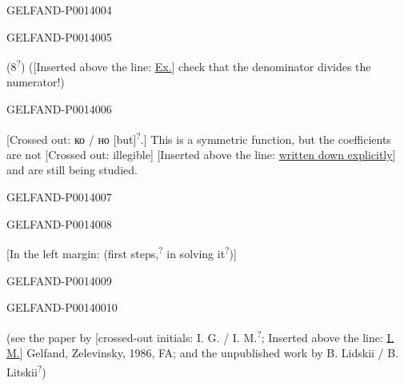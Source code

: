 \begin{GelfandAdjacentEvidence}{GELFAND-P001400}{4}

\end{GelfandAdjacentEvidence}
\begin{GelfandAdjacentEvidence}{GELFAND-P001400}{5}


(\(8\)\textsuperscript{?})
([Inserted above the line: \uline{Ex.}] check that the denominator divides the numerator!)

\end{GelfandAdjacentEvidence}
\begin{GelfandAdjacentEvidence}{GELFAND-P001400}{6}



[Crossed out: ко / но [but]\textsuperscript{?}.]
This is a symmetric function, but the coefficients are not
[Crossed out: illegible]
[Inserted above the line: \uline{written down explicitly}] and are still being studied.

\end{GelfandAdjacentEvidence}
\begin{GelfandAdjacentEvidence}{GELFAND-P001400}{7}

\end{GelfandAdjacentEvidence}
\begin{GelfandAdjacentEvidence}{GELFAND-P001400}{8}



[In the left margin: (first steps,\textsuperscript{?}
in solving it\textsuperscript{?})]

\end{GelfandAdjacentEvidence}
\begin{GelfandAdjacentEvidence}{GELFAND-P001400}{9}

\end{GelfandAdjacentEvidence}
\begin{GelfandAdjacentEvidence}{GELFAND-P001400}{10}



(see the paper by [crossed-out initials:
I. G. / I. M.\textsuperscript{?};
Inserted above the line: \uline{I. M.}] Gelfand, Zelevinsky, 1986, FA; and the unpublished work by
B. Lidskii / B. Litskii\textsuperscript{?})

\end{GelfandAdjacentEvidence}
